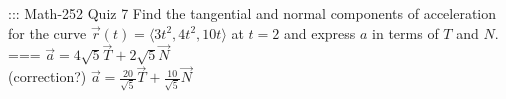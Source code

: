 ::: Math-252 Quiz 7
Find the tangential and normal components of acceleration for the curve
\(\vec r(t)=\langle 3t^2,4t^2,10t\rangle\) at \(t=2\) and express \(a\) in terms
of \(T\) and \(N\).
===
\(\vec a=4\sqrt 5\vec T+2\sqrt 5\vec N\)\\
(correction?) \(\vec a=\frac{20}{\sqrt 5}\vec T+\frac{10}{\sqrt 5}\vec N\)
